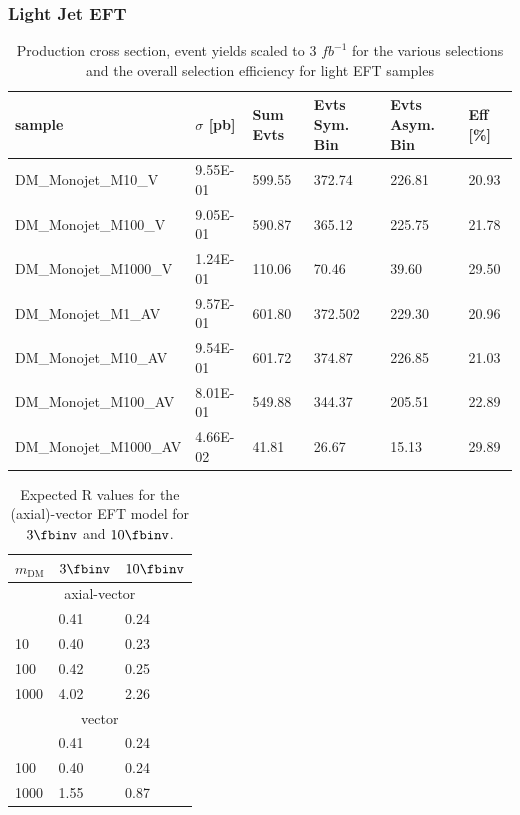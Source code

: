 \subsubsection{Light Jet EFT}
\begin{table}[h]
\centering
\begin{tabular}{llllll}
\hline
sample             & $\sigma$ [pb] & Sum Evts       & Evts Sym. Bin & Evts Asym. Bin & Eff  [\%]   \\\hline
DM\_Monojet\_M10\_V    & 9.55E-01 & 599.55    & 372.74    & 226.81    & 20.93    \\
DM\_Monojet\_M100\_V   & 9.05E-01 & 590.87    & 365.12    & 225.75    & 21.78    \\
DM\_Monojet\_M1000\_V  & 1.24E-01 & 110.06    & 70.46     & 39.60     & 29.50    \\
DM\_Monojet\_M1\_AV    & 9.57E-01 & 601.80    & 372.502    & 229.30   & 20.96    \\
DM\_Monojet\_M10\_AV   & 9.54E-01 & 601.72    & 374.87    & 226.85    & 21.03    \\
DM\_Monojet\_M100\_AV  & 8.01E-01 & 549.88    & 344.37    & 205.51    & 22.89    \\
DM\_Monojet\_M1000\_AV & 4.66E-02 & 41.81     & 26.67     & 15.13     & 29.89    \\
\hline
\end{tabular}
\caption{Production cross section, event yields scaled to 3 $fb^{-1 }$ for the various selections and the overall selection efficiency for light EFT samples}
\label{tab:dm_dmtt_S_g1}
\end{table}

\begin{table}[h]
\centering
\begin{tabular}{lll}\hline
$m_{\textrm{DM}}$& $3\fbinv$  & $10\fbinv$ \\\hline
\multicolumn{3}{c}{axial-vector}        \\\line
1             & 0.41 & 0.24 \\
10            & 0.40 & 0.23 \\
100           & 0.42 & 0.25 \\
1000          & 4.02 & 2.26 \\\hline
\multicolumn{3}{c}{vector}        \\\line
10            & 0.41 & 0.24 \\
100           & 0.40 & 0.24 \\
1000          & 1.55 & 0.87\\
\hline
\end{tabular}
\caption{Expected R values for the (axial)-vector EFT model for $3\fbinv$ and $10\fbinv$.} 
\label{tab:dm_mj_eft_rvalues}
\end{table}


